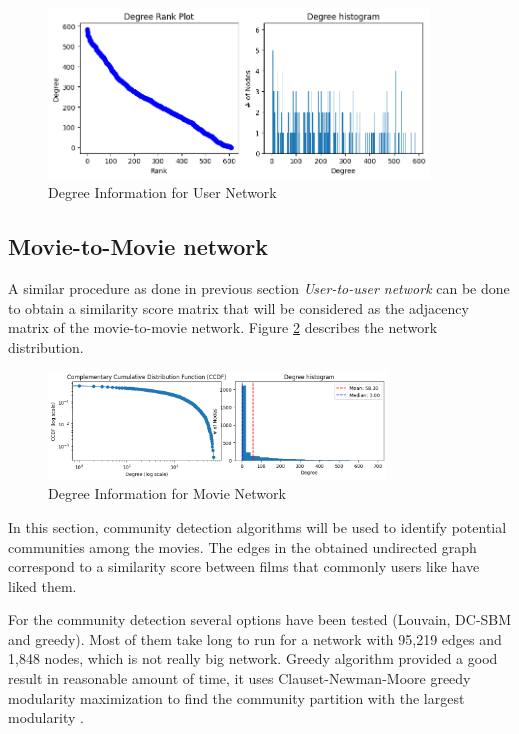 \documentclass[12pt]{article}
\numberwithin{equation}{section}
\begin{document}
\begin{figure}[h!]
    \begin{minipage}[b]{01\linewidth}
         \centering
  	\includegraphics[width=0.9\textwidth]{UN_degreeinfo.png}
  	\caption{Degree Information for User Network}
  	\label{fig:UN_degreeinfo}
    \end{minipage}
\end{figure}

\newpage
\subsection{Movie-to-Movie network}

A similar procedure as done in previous section \textit{User-to-user network} can be done to obtain a similarity score matrix that will be considered as the adjacency matrix of the movie-to-movie network. Figure \ref{fig:MN_degreeinfo} describes the network distribution. 

\begin{figure}[h]
    \centering
  	\includegraphics[width=0.8\textwidth]{movie2movie_analysis.png}
  	\caption{Degree Information for Movie Network}
  	\label{fig:MN_degreeinfo}
\end{figure}

In this section, community detection algorithms will be used to identify potential communities among the movies. The edges in the obtained undirected graph correspond to a similarity score between films that commonly users like have liked them. 

For the community detection several options have been tested (Louvain, DC-SBM and greedy). Most of them take long to run for a network with 95,219 edges and 1,848 nodes, which is not really big network. Greedy algorithm provided a good result in reasonable amount of time, it uses Clauset-Newman-Moore greedy modularity maximization to find the community partition with the largest modularity \cite{greedy}.
\end{document}
